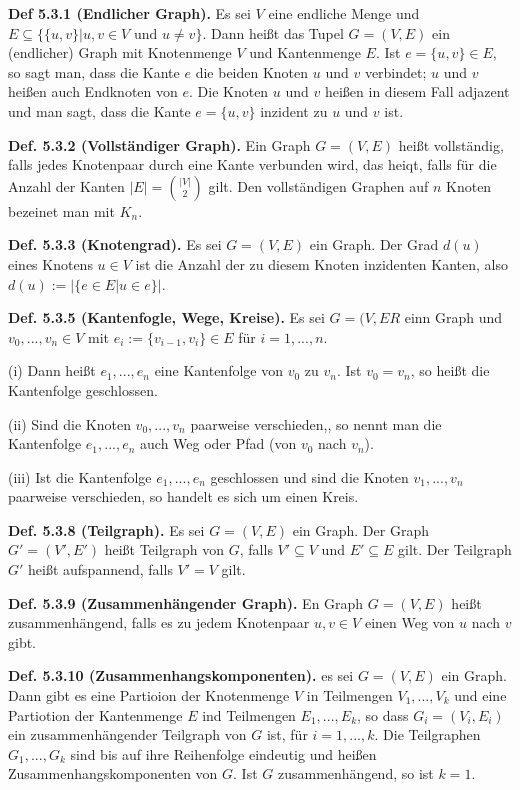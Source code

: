 \textbf{Def 5.3.1 (Endlicher Graph).} Es sei $V$ eine endliche Menge und $E \subseteq \{\{u,v\} \vert u,v \in V \text{ und } u \neq v \}$. Dann heißt das Tupel $G= (V,E)$ ein (endlicher) Graph mit Knotenmenge $V$ und Kantenmenge $E$. Ist $e= \{u,v\} \in E$, so sagt man, dass die Kante $e$ die beiden Knoten $u$ und $v$ verbindet; $u$ und $v$ heißen auch Endknoten von $e$. Die Knoten $u$ und $v$ heißen in diesem Fall adjazent und man sagt, dass die Kante $e= \{u,v\}$ inzident zu $u$ und $v$ ist.

\textbf{Def. 5.3.2 (Vollständiger Graph).} Ein Graph $G=(V,E)$ heißt vollständig, falls jedes Knotenpaar durch eine Kante verbunden wird, das heiqt, falls für die Anzahl der Kanten $\vert E \vert = \binom{\vert V \vert}{2}$ gilt. Den vollständigen Graphen auf $n$ Knoten bezeinet man mit $K_n$.

\textbf{Def. 5.3.3 (Knotengrad).} Es sei $G= (V,E)$ ein Graph. Der Grad $d(u)$ eines Knotens $u\in V$ ist die Anzahl der zu diesem Knoten inzidenten Kanten, also $d(u) := \vert \{ e \in  E \vert u \in e \} \vert$.

\textbf{Def. 5.3.5 (Kantenfogle, Wege, Kreise).} Es sei $ G= (V,ER$ einn Graph und $v_0, ... , v_n \in V$ mit $e_i := \{ v_{i-1}, v_i\} \in E$ für $i=1,...,n$.

(i) Dann heißt $e_1, ...,e_n$ eine Kantenfolge von $v_0$ zu $v_n$. Ist $v_0 = v_n$, so heißt die Kantenfolge geschlossen.

(ii) Sind die Knoten $v_0,...,v_n$ paarweise verschieden,, so nennt man die Kantenfolge $e_1,...,e_n$ auch Weg oder Pfad (von $v_0$ nach $v_n$).

(iii) Ist die Kantenfolge $e_1, ...,e_n$ geschlossen und sind die Knoten $v_1,...,v_n$ paarweise verschieden, so handelt es sich um einen Kreis.

\textbf{Def. 5.3.8 (Teilgraph).} Es sei $G = (V,E)$ ein Graph. Der Graph $G' = (V',E')$ heißt Teilgraph von $G$, falls $V' \subseteq V$ und $E' \subseteq E$ gilt. Der Teilgraph $G'$ heißt aufspannend, falls $V' = V$ gilt.

\textbf{Def. 5.3.9 (Zusammenhängender Graph).} En Graph $G= (V,E)$ heißt zusammenhängend, falls es zu jedem Knotenpaar $u,v\in V$ einen Weg von $u$ nach $v$ gibt.

\textbf{Def. 5.3.10 (Zusammenhangskomponenten).} es sei $G = (V,E)$ ein Graph. Dann gibt es eine Partioion der Knotenmenge $V$ in Teilmengen $V_1,...,V_k$ und eine Partiotion der Kantenmenge $E$ ind Teilmengen $E_1,...,E_k$, so dass $G_i = (V_i,E_i)$ ein zusammenhängender Teilgraph von $G$ ist, für $i = 1,...,k$. Die Teilgraphen $G_1,...,G_k$ sind bis auf ihre Reihenfolge eindeutig und heißen Zusammenhangskomponenten von $G$. Ist $G$ zusammenhängend, so ist $k=1$.

